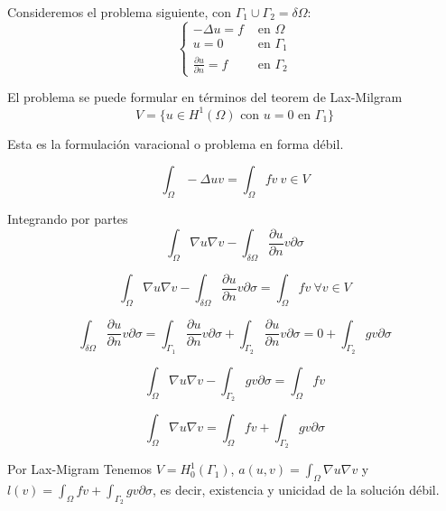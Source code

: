 	\begin{example}
		Consideremos el problema siguiente, con $\Gamma_1 \cup \Gamma_2 = \delta \Omega$:		
		\begin{equation*}
			\left\{
			\begin{matrix}
				-\Delta u = f & \text{ en } \Omega\\
				u = 0 & \text{ en } \Gamma_1\\
				\frac{\partial u}{\partial n} = f & \text{ en } \Gamma_2
			\end{matrix}
			\right.
		\end{equation*}
		
		El problema se puede formular en términos del teorem de Lax-Milgram 
		$$V = \{u\in H^1(\Omega) \text{ con } u = 0 \text{ en } \Gamma_1 \}$$
		
		Esta es la formulación varacional o problema en forma débil.
		
		$$\int_\Omega -\Delta uv = \int_\Omega fv \ v\in V$$
		
		Integrando por partes
		$$\int_\Omega \nabla u\nabla v - \int _{\delta \Omega}\frac{\partial u}{\partial n} v \partial \sigma$$
		
		$$\int_\Omega \nabla u\nabla v - \int _{\delta \Omega}\frac{\partial u}{\partial n} v \partial \sigma = \int _\Omega fv \ \forall v \in V$$
		
		$$\int _{\delta \Omega}\frac{\partial u}{\partial n} v \partial \sigma 
		= 
		\int _{\Gamma_1}\frac{\partial u}{\partial n} v \partial \sigma
		+
		\int _{\Gamma_2}\frac{\partial u}{\partial n} v \partial \sigma
		= 
		0+\int_{\Gamma_2} gv\partial\sigma$$
		
		$$\int_\Omega \nabla u\nabla v - \int _{\Gamma_2}g v \partial \sigma = \int _\Omega fv$$
		
		$$\int_\Omega \nabla u\nabla v  = \int _\Omega fv + \int _{\Gamma_2}g v \partial \sigma$$
		
		Por Lax-Migram 
		Tenemos $V = H_0^1(\Gamma_1)$,  $a(u,v) = \int_{\Omega}\nabla u\nabla v$ y $l(v) = \int _\Omega fv + \int _{\Gamma_2} gv\partial \sigma$, es decir, existencia y unicidad de la solución débil.
	\end{example}
	
	
	
	
	

